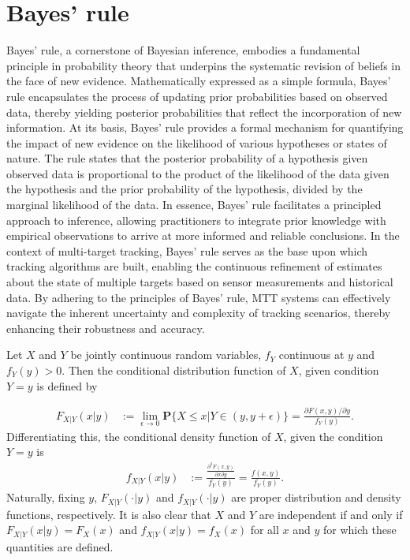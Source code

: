     \section{Bayes' rule}
Bayes' rule, a cornerstone of Bayesian inference, embodies a fundamental principle in probability theory that underpins the systematic revision of beliefs in the face of new evidence. Mathematically expressed as a simple formula, Bayes' rule encapsulates the process of updating prior probabilities based on observed data, thereby yielding posterior probabilities that reflect the incorporation of new information. At its basis, Bayes' rule provides a formal mechanism for quantifying the impact of new evidence on the likelihood of various hypotheses or states of nature. The rule states that the posterior probability of a hypothesis given observed data is proportional to the product of the likelihood of the data given the hypothesis and the prior probability of the hypothesis, divided by the marginal likelihood of the data. In essence, Bayes' rule facilitates a principled approach to inference, allowing practitioners to integrate prior knowledge with empirical observations to arrive at more informed and reliable conclusions. In the context of multi-target tracking, Bayes' rule serves as the base upon which tracking algorithms are built, enabling the continuous refinement of estimates about the state of multiple targets based on sensor measurements and historical data. By adhering to the principles of Bayes' rule, MTT systems can effectively navigate the inherent uncertainty and complexity of tracking scenarios, thereby enhancing their robustness and accuracy.
    \begin{definition}
    Let $X$ and $Y$ be jointly continuous random variables, $f_Y$ continuous at $y$ and $f_Y(y) > 0$. Then the conditional distribution function of $X$, given condition ${Y=y}$ is defined by
    \end{definition}
    \begin{align}
        F_{X|Y}(x|y) &:= \lim_{\epsilon\to0} \textbf{P}\{X\leq x | Y \in (y, y + \epsilon)\} = \frac{\partial F(x,y) /
        \partial y}{f_Y(y)}.\label{eq:conditional_distribution}
    \end{align}
    Differentiating this, the conditional density function of $X$, given the condition ${Y = y}$ is
    \begin{align}
        f_{X|Y}(x|y) &:= \frac{ \frac{\partial^2 F(x,y)}{\partial x \partial y}}{f_Y(y)} = \frac{f(x,y)}{f_Y(y)}. \label{eq:conditional_distribution2}
    \end{align}
    Naturally, fixing $y$, $F_{X|Y}(\cdot|y)$ and $f_{X|Y}(\cdot|y)$ are proper distribution and density functions, respectively. It is also clear that $X$ and $Y$ are independent if and only if $F_{X|Y}(x|y) = F_X(x)$ and $f_{X|Y}(x|y) = f_X(x)$ for all $x$ and $y$ for which these quantities are defined.

